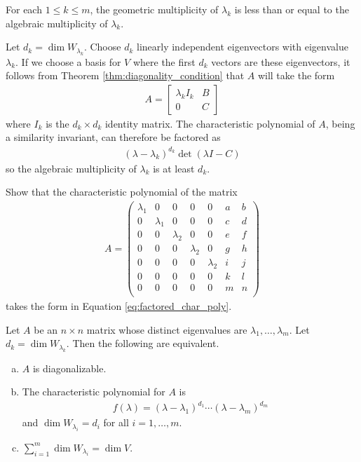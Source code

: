 \documentclass[12pt,letterpaper,reqno]{article}
\numberwithin{equation}{section}
\begin{document}
\begin{lem}
For each $1 \leq k \leq m$, the geometric multiplicity of $\lambda_k$ is less than or equal to the algebraic multiplicity of $\lambda_k$.	
\end{lem}

\begin{pf}
Let $d_k=\dim W_{\lambda_k}$. Choose $d_k$ linearly independent eigenvectors with eigenvalue $\lambda_k$. If we choose a basis for $V$ where the first $d_k$ vectors are these eigenvectors, it follows from Theorem \ref{thm:diagonality_condition} that $A$ will take the form
\begin{align*}
	A=\begin{bmatrix}
		\lambda_k I_k & B \\
		0 & C
	\end{bmatrix}
\end{align*}
where $I_k$ is the $d_k \times d_k$ identity matrix. The characteristic polynomial of $A$, being a similarity invariant, can therefore be factored as 
\begin{align}\label{eq:factored_char_poly}
	(\lambda-\lambda_k)^{d_k}\det(\lambda I-C)
\end{align}
so the algebraic multiplicity of $\lambda_k$ is at least $d_k$.
\end{pf}

\begin{exercise}
	Show that the characteristic polynomial of the matrix
	\begin{align*}
		A=\begin{pmatrix}
			\lambda_1 & 0 & 0 & 0 & 0 & a & b \\
			0 & \lambda_1 & 0 & 0 & 0 & c & d \\
			0 & 0 & \lambda_2 & 0 & 0 & e & f \\
			0 & 0 & 0 & \lambda_2 & 0 & g & h \\
			0 & 0 & 0 & 0 & \lambda_2 & i & j \\
			0 & 0 & 0 & 0 & 0 & k & l \\
			0 & 0 & 0 & 0 & 0 & m & n \\
		\end{pmatrix}
	\end{align*}
	takes the form in Equation \eqref{eq:factored_char_poly}.
\end{exercise}


\begin{thm}\label{thm:diagonalization_thm}
	Let $A$ be an $n \times n$ matrix whose distinct eigenvalues are $\lambda_1,\dots,\lambda_m$. Let $d_k=\dim W_{\lambda_k}$. Then the following are equivalent.
	\begin{enumerate}[(a)]
		\item $A$ is diagonalizable.
		\item The characteristic polynomial for $A$ is 
		\begin{align*}
			f(\lambda)=(\lambda-\lambda_1)^{d_1}\cdots (\lambda-\lambda_m)^{d_m} 
		\end{align*}
		and $\dim W_{\lambda_i}=d_i$ for all $i=1,\dots,m$.
		\item $\sum_{i=1}^m\dim W_{\lambda_i}=\dim V$.
	\end{enumerate}
\end{thm}
\end{document}
